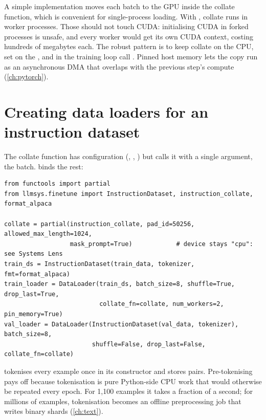\begin{systemslens}
A simple implementation moves each batch to the GPU inside the collate function, which is
convenient for single-process loading. With , collate runs in
worker processes. Those should not touch CUDA: initialising CUDA in forked processes is
unsafe, and every worker would get its own CUDA context, costing hundreds of megabytes
each. The robust pattern is to keep collate on the CPU, set  on
the , and in the training loop call
. Pinned host memory lets the copy run as an
asynchronous DMA that overlaps with the previous step's compute (\cref{ch:pytorch}).
\end{systemslens}

\section{Creating data loaders for an instruction dataset}\label{sec:instruct:loaders}

The collate function has configuration (, ,
) but  calls it with a single argument, the batch.
 binds the rest:

\begin{lstlisting}[caption={Instruction data loaders.},label={lst:instruct:loaders}]
from functools import partial
from llmsys.finetune import InstructionDataset, instruction_collate, format_alpaca

collate = partial(instruction_collate, pad_id=50256, allowed_max_length=1024,
                  mask_prompt=True)            # device stays "cpu": see Systems Lens
train_ds = InstructionDataset(train_data, tokenizer, fmt=format_alpaca)
train_loader = DataLoader(train_ds, batch_size=8, shuffle=True, drop_last=True,
                          collate_fn=collate, num_workers=2, pin_memory=True)
val_loader = DataLoader(InstructionDataset(val_data, tokenizer), batch_size=8,
                        shuffle=False, drop_last=False, collate_fn=collate)
\end{lstlisting}

 tokenises every example once in its constructor and stores
 pairs. Pre-tokenising pays off because tokenisation is pure
Python-side CPU work that would otherwise be repeated every epoch. For 1{,}100 examples
it takes a fraction of a second; for millions of examples, tokenisation becomes an
offline preprocessing job that writes binary shards (\cref{ch:text}).

